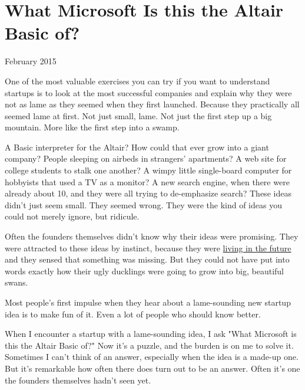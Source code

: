 \chapter{What Microsoft Is this the Altair Basic of?}


            
              
                

February 2015

One of the most valuable exercises
                  you can try if you want to understand startups is to look at
                  the most successful companies and explain why they were not as
                  lame as they seemed when they first launched. Because they
                  practically all seemed lame at first. Not just small, lame.
                  Not just the first step up a big mountain. More like the first
                  step into a swamp.

A Basic interpreter for the
                  Altair? How could that ever grow into a giant company? People
                  sleeping on airbeds in strangers' apartments? A web site for
                  college students to stalk one another? A wimpy little
                  single-board computer for hobbyists that used a TV as a
                  monitor? A new search engine, when there were already about
                  10, and they were all trying to de-emphasize search? These
                  ideas didn't just seem small. They seemed wrong. They were the
                  kind of ideas you could not merely ignore, but ridicule.

Often
                  the founders themselves didn't know why their ideas were
                  promising. They were attracted to these ideas by instinct,
                  because they were
                  \href{http://www.paulgraham.com/startupideas.html}{living in the future} and they
                  sensed that something was missing. But they could not have put
                  into words exactly how their ugly ducklings were going to grow
                  into big, beautiful swans.

Most people's first
                  impulse when they hear about a lame-sounding new startup idea
                  is to make fun of it. Even a lot of people who should know
                  better.

When I encounter a startup with a
                  lame-sounding idea, I ask "What Microsoft is this the Altair
                  Basic of?" Now it's a puzzle, and the burden is on me to solve
                  it. Sometimes I can't think of an answer, especially when the
                  idea is a made-up one. But it's remarkable how often there
                  does turn out to be an answer. Often it's one the founders
                  themselves hadn't seen yet.

